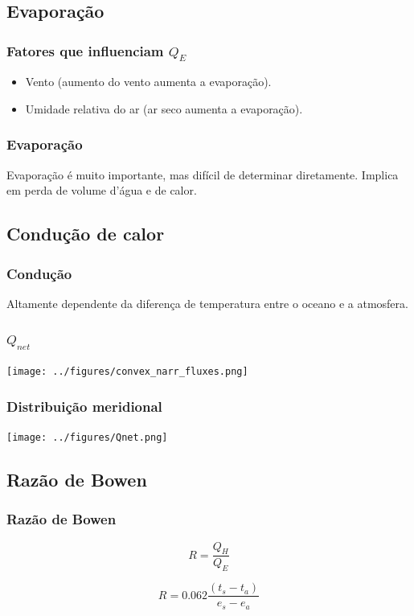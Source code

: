 \subsection{Evaporação}
\begin{frame}
  \frametitle{Fatores que influenciam $Q_E$}
  \begin{itemize}
    \item Vento (aumento do vento aumenta a evaporação).
    \item Umidade relativa do ar (ar seco aumenta a evaporação).
  \end{itemize}
\end{frame}

\begin{frame}
  \frametitle{Evaporação}
  \begin{block}{}
    Evaporação é muito importante, mas difícil de determinar diretamente.
    Implica em perda de volume d'água e de calor.
  \end{block}
\end{frame}

\subsection{Condução de calor}
\begin{frame}
  \frametitle{Condução}
  \begin{block}{}
    Altamente dependente da diferença de temperatura entre o oceano e a atmosfera.
  \end{block}

\end{frame}

\begin{frame}
  \frametitle{$Q_{net}$}
  \begin{center}
    \texttt{[image: ../figures/convex\_narr\_fluxes.png]}
  \end{center}
\end{frame}


\begin{frame}
  \frametitle{Distribuição meridional}
  \begin{center}
    \texttt{[image: ../figures/Qnet.png]}
  \end{center}
\end{frame}


\subsection{Razão de Bowen}
\begin{frame}
  \frametitle{Razão de Bowen}
  \begin{block}{}
    \[
      R = \frac{Q_H}{Q_E}
    \]

    \[
      R = 0.062 \frac{(t_s - t_a)}{e_s - e_a}
    \]
  \end{block}
\end{frame}

